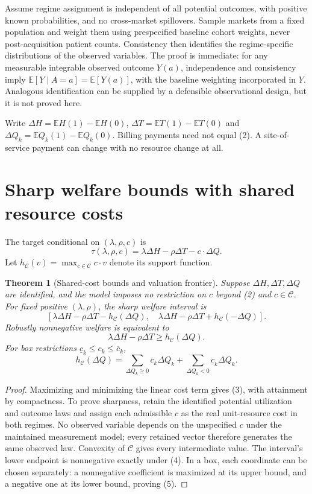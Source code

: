 \documentclass[11pt]{article}
\newtheorem{theorem}{Theorem}
\theoremstyle{remark}
\newcommand{\E}{\mathbb E}
\begin{document}
Assume regime assignment is independent of all potential outcomes, with positive known probabilities, and no cross-market spillovers. Sample markets from a fixed population and weight them using prespecified baseline cohort weights, never post-acquisition patient counts. Consistency then identifies the regime-specific distributions of the observed variables. The proof is immediate: for any measurable integrable observed outcome $Y(a)$, independence and consistency imply $\E[Y\mid A=a]=\E[Y(a)]$, with the baseline weighting incorporated in $Y$. Analogous identification can be supplied by a defensible observational design, but it is not proved here.

Write $\Delta H=\E H(1)-\E H(0)$, $\Delta T=\E T(1)-\E T(0)$ and $\Delta Q_k=\E Q_k(1)-\E Q_k(0)$. Billing payments need not equal (2). A site-of-service payment can change with no resource change at all.

\section{Sharp welfare bounds with shared resource costs}
The target conditional on $(\lambda,\rho,c)$ is
\[
 \tau(\lambda,\rho,c)=\lambda\Delta H-\rho\Delta T-c\cdot\Delta Q.
\]
Let $h_{\mathcal C}(v)=\max_{c\in\mathcal C}c\cdot v$ denote its support function.

\begin{theorem}[Shared-cost bounds and valuation frontier]
Suppose $\Delta H,\Delta T,\Delta Q$ are identified, and the model imposes no restriction on $c$ beyond (2) and $c\in\mathcal C$. For fixed positive $(\lambda,\rho)$, the sharp welfare interval is
\[
 \left[\lambda\Delta H-\rho\Delta T-h_{\mathcal C}(\Delta Q),\quad
       \lambda\Delta H-\rho\Delta T+h_{\mathcal C}(-\Delta Q)\right]. \tag{3}
\]
Robustly nonnegative welfare is equivalent to
\[
 \lambda\Delta H-\rho\Delta T\geq h_{\mathcal C}(\Delta Q).       \tag{4}
\]
For box restrictions $\underline c_k\leq c_k\leq\overline c_k$,
\[
 h_{\mathcal C}(\Delta Q)=
 \sum_{\Delta Q_k\geq0}\overline c_k\Delta Q_k+
 \sum_{\Delta Q_k<0}\underline c_k\Delta Q_k.             \tag{5}
\]
\end{theorem}
\begin{proof}
Maximizing and minimizing the linear cost term gives (3), with attainment by compactness. To prove sharpness, retain the identified potential utilization and outcome laws and assign each admissible $c$ as the real unit-resource cost in both regimes. No observed variable depends on the unspecified $c$ under the maintained measurement model; every retained vector therefore generates the same observed law. Convexity of $\mathcal C$ gives every intermediate value. The interval's lower endpoint is nonnegative exactly under (4). In a box, each coordinate can be chosen separately: a nonnegative coefficient is maximized at its upper bound, and a negative one at its lower bound, proving (5).
\end{proof}
\end{document}
